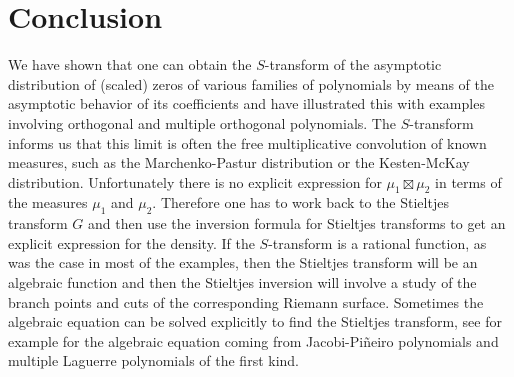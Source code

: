\documentclass[12pt]{article}
\numberwithin{equation}{section}
\begin{document}
\section{Conclusion}
We have shown that one can obtain the $S$-transform of the asymptotic distribution of (scaled) zeros of various families of polynomials by means of the asymptotic behavior of its coefficients and have illustrated this with examples involving orthogonal and multiple orthogonal polynomials. The $S$-transform informs us that this limit is
often the free multiplicative convolution of known measures, such as the Marchenko-Pastur distribution or the Kesten-McKay distribution.
Unfortunately there is no explicit expression for $\mu_1 \boxtimes \mu_2$ in terms of the measures $\mu_1$ and $\mu_2$. Therefore one has to work back to the
Stieltjes transform $G$ and then use the inversion formula for Stieltjes transforms to get an explicit expression for the density. If the $S$-transform is a rational function,
as was the case in most of the examples, then the Stieltjes transform will be an algebraic function and then the Stieltjes inversion will involve a study of the 
branch points and cuts of the corresponding Riemann surface. Sometimes the algebraic equation can be solved explicitly to find the Stieltjes transform,
see for example \cite{NeuschelWVA} for the algebraic equation coming from Jacobi-Pi\~neiro polynomials and multiple Laguerre polynomials of the first kind. 
\end{document}
